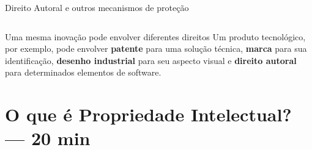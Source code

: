 \documentclass[9pt]{beamer}
\begin{document}
\begin{frame}{Direito Autoral e outros mecanismos de proteção}
\begin{columns}[T]
  \end{columns}

  \vspace{0.25cm}

  \begin{block}{Uma mesma inovação pode envolver diferentes direitos}
    \small
    Um produto tecnológico, por exemplo, pode envolver
    \textbf{patente} para uma solução técnica,
    \textbf{marca} para sua identificação,
    \textbf{desenho industrial} para seu aspecto visual
    e \textbf{direito autoral} para determinados elementos de software.
  \end{block}

\end{frame}
\section{O que é Propriedade Intelectual? — 20 min}
\end{document}
